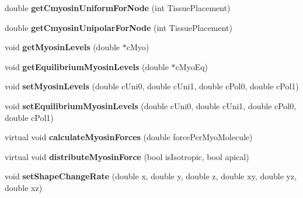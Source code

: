 \begin{DoxyCompactItemize}
\item 
\hypertarget{classShapeBase_a1a1d8053c99109b0c13b06b2cca44dee}{}double {\bfseries get\+Cmyosin\+Uniform\+For\+Node} (int Tissue\+Placement)\label{classShapeBase_a1a1d8053c99109b0c13b06b2cca44dee}

\item 
\hypertarget{classShapeBase_a69ec8a1780b516d47560a25ba17f672a}{}double {\bfseries get\+Cmyosin\+Unipolar\+For\+Node} (int Tissue\+Placement)\label{classShapeBase_a69ec8a1780b516d47560a25ba17f672a}

\item 
\hypertarget{classShapeBase_afa44aa076cefed9d57f61dce7574832a}{}void {\bfseries get\+Myosin\+Levels} (double $\ast$c\+Myo)\label{classShapeBase_afa44aa076cefed9d57f61dce7574832a}

\item 
\hypertarget{classShapeBase_ab31ad5e068aeb94f4e851b64d966547a}{}void {\bfseries get\+Equilibrium\+Myosin\+Levels} (double $\ast$c\+Myo\+Eq)\label{classShapeBase_ab31ad5e068aeb94f4e851b64d966547a}

\item 
\hypertarget{classShapeBase_afbcfcd90f0942e917fdc1deb1df1be1c}{}void {\bfseries set\+Myosin\+Levels} (double c\+Uni0, double c\+Uni1, double c\+Pol0, double c\+Pol1)\label{classShapeBase_afbcfcd90f0942e917fdc1deb1df1be1c}

\item 
\hypertarget{classShapeBase_adef29b02faa010719b0810d3643c6b62}{}void {\bfseries set\+Equilibrium\+Myosin\+Levels} (double c\+Uni0, double c\+Uni1, double c\+Pol0, double c\+Pol1)\label{classShapeBase_adef29b02faa010719b0810d3643c6b62}

\item 
\hypertarget{classShapeBase_ac4bc4f757144dc10e6c3170e23c30af0}{}virtual void {\bfseries calculate\+Myosin\+Forces} (double force\+Per\+Myo\+Molecule)\label{classShapeBase_ac4bc4f757144dc10e6c3170e23c30af0}

\item 
\hypertarget{classShapeBase_a62661832529c1556931dea66adfd7ef9}{}virtual void {\bfseries distribute\+Myosin\+Force} (bool is\+Isotropic, bool apical)\label{classShapeBase_a62661832529c1556931dea66adfd7ef9}

\item 
\hypertarget{classShapeBase_a8a9f91384133d8953dbb38d71cc29d51}{}void {\bfseries set\+Shape\+Change\+Rate} (double x, double y, double z, double xy, double yz, double xz)\label{classShapeBase_a8a9f91384133d8953dbb38d71cc29d51}


\end{DoxyCompactItemize}
